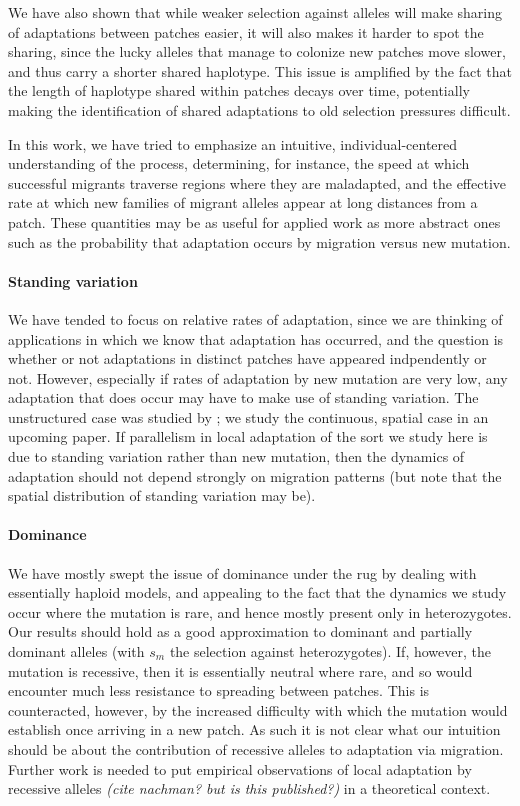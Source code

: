 \documentclass{article}
\newcommand{\plr}[1]{{\it\color{blue}(#1)}}
\begin{document}
We have also shown that
while weaker selection against alleles will make sharing 
of adaptations between patches easier, 
it will also makes it harder to spot the sharing,
since the lucky alleles that manage to colonize new patches move slower,
and thus carry a shorter shared haplotype.
This issue is amplified by the fact that the length of haplotype
shared within patches decays over time, potentially making the
identification of shared adaptations to old selection pressures difficult.

In this work, we have tried to emphasize an intuitive, individual-centered understanding of the process,
determining, for instance, 
the speed at which successful migrants traverse regions where they are maladapted,
and the effective rate at which new families of migrant alleles appear
at long distances from a patch.
These quantities may be as useful for applied work
as more abstract ones such as the probability that adaptation occurs by migration versus new mutation.


\paragraph{Standing variation} 
We have tended to focus on relative rates of adaptation,
since we are thinking of applications in which we know that adaptation has occurred,
and the question is whether or not adaptations in distinct patches
have appeared indpendently or not.
However, especially if rates of adaptation by new mutation are very low,
any adaptation that does occur may have to make use of standing variation.
The unstructured case was studied by \citet{softsweepsI};
we study the continuous, spatial case in an upcoming paper.
If parallelism in local adaptation of the sort we study here is due to standing variation
rather than new mutation,
then the dynamics of adaptation should not depend strongly on migration patterns
(but note that the spatial distribution of standing variation may be).

\paragraph{Dominance}
We have mostly swept the issue of dominance under the rug
by dealing with essentially haploid models,
and appealing to the fact that the dynamics we study occur where the mutation is rare,
and hence mostly present only in heterozygotes. 
Our results should hold as a good approximation to dominant and partially dominant alleles
(with $s_m$ the selection against heterozygotes).
If, however, the mutation is recessive, then it is essentially neutral where rare,
and so would encounter much less resistance to spreading between patches.
This is counteracted, however, by the increased difficulty with which the mutation would establish
once arriving in a new patch. 
As such it is not clear what our intuition should be 
about the contribution of recessive alleles to adaptation via migration. 
Further work is needed to put empirical observations of local adaptation by recessive alleles 
\plr{cite nachman? but is this published?}
in a theoretical context.
\end{document}
